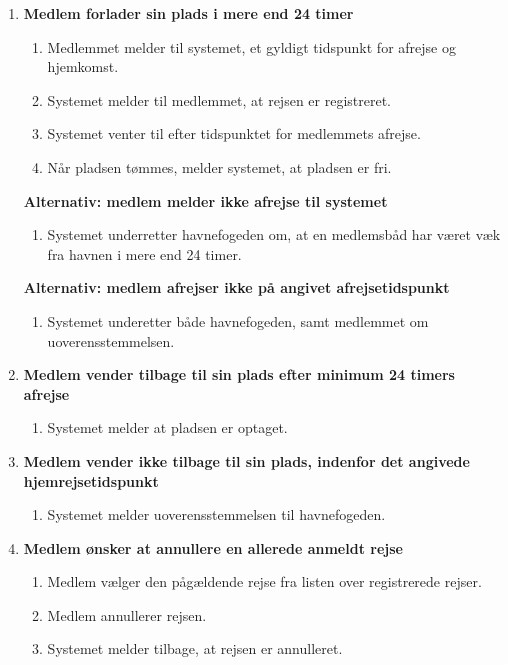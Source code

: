   \begin{enumerate}

    \item{\bf{Medlem forlader sin plads i mere end 24 timer}}
      \begin{enumerate}
        \item Medlemmet melder til systemet, et gyldigt tidspunkt for afrejse og hjemkomst.
        \item Systemet melder til medlemmet, at rejsen er registreret.
        \item Systemet venter til efter tidspunktet for medlemmets afrejse.
        \item Når pladsen tømmes, melder systemet, at pladsen er fri.
      \end{enumerate}

    \bf{Alternativ: medlem melder ikke afrejse til systemet}
      \begin{enumerate}
        \item Systemet underretter havnefogeden om, at en medlemsbåd har været væk fra havnen i mere end 24 timer.
      \end{enumerate}

    \bf{Alternativ: medlem afrejser ikke på angivet afrejsetidspunkt}
      \begin{enumerate}
        \item Systemet underetter både havnefogeden, samt medlemmet om uoverensstemmelsen.
      \end{enumerate}

    \item{\bf{Medlem vender tilbage til sin plads efter minimum 24 timers afrejse}}
      \begin{enumerate}
        \item Systemet melder at pladsen er optaget.
      \end{enumerate}

    \item{\bf{Medlem vender ikke tilbage til sin plads, indenfor det angivede hjemrejsetidspunkt}}
      \begin{enumerate}
        \item Systemet melder uoverensstemmelsen til havnefogeden.
      \end{enumerate}

    \item{\bf{Medlem ønsker at annullere en allerede anmeldt rejse}}
      \begin{enumerate}
        \item Medlem vælger den pågældende rejse fra listen over registrerede rejser.
        \item Medlem annullerer rejsen.
        \item Systemet melder tilbage, at rejsen er annulleret.
      \end{enumerate}
	  

\end{enumerate}
